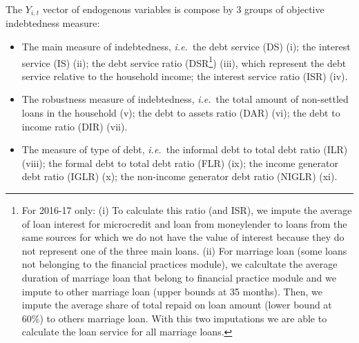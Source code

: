 \documentclass[a4paper, 11pt, onecolumn]{article}
\newcommand{\ie}{\textit{i.e.}}
\begin{document}
The $Y_{i,t}$ vector of endogenous variables is compose by 3 groups of objective indebtedness measure: 
\begin{itemize}
\item The main measure of indebtedness, \ie~the debt service (DS) (i); the interest service (IS) (ii); the debt service ratio (DSR\footnote{For 2016-17 only: (i) To calculate this ratio (and ISR), we impute the average of loan interest for microcredit and loan from moneylender to loans from the same sources for which we do not have the value of interest because they do not represent one of the three main loans. (ii) For marriage loan (some loans not belonging to the financial practices module), we calcultate the average duration of marriage loan that belong to financial practice module and we impute to other marriage loan (upper bounds at 35 months). Then, we impute the average share of total repaid on loan amount (lower bound at 60\%) to others marriage loan. With this two imputations we are able to calculate the loan service for all marriage loans.}) (iii), which represent the debt service relative to the household income; the interest service ratio (ISR) (iv).

\item The robustness measure of indebtedness, \ie~the total amount of non-settled loans in the household (v); the debt to assets ratio (DAR) (vi); the debt to income ratio (DIR) (vii).

\item The measure of type of debt, \ie~the informal debt to total debt ratio (ILR) (viii); the formal debt to total debt ratio (FLR) (ix); the income generator debt ratio (IGLR) (x); the non-income generator debt ratio (NIGLR) (xi).
\end{itemize}
\end{document}
